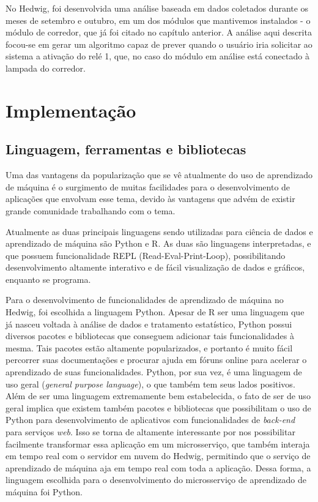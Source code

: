 		No Hedwig, foi desenvolvida uma análise baseada em dados coletados durante os meses de setembro e outubro, em um dos módulos que mantivemos instalados - o módulo de corredor, que já foi citado no capítulo anterior. A análise aqui descrita focou-se em gerar um algoritmo capaz de prever quando o usuário iria solicitar ao sistema a ativação do relé 1, que, no caso do módulo em análise está conectado à lampada do corredor. 



	\section{Implementação}

		\subsection{Linguagem, ferramentas e bibliotecas}

			Uma das vantagens da popularização que se vê atualmente do uso de aprendizado de máquina é o surgimento de muitas facilidades para o desenvolvimento de aplicações que envolvam esse tema, devido às vantagens que advém de existir grande comunidade trabalhando com o tema.

			Atualmente as duas principais linguagens sendo utilizadas para ciência de dados e aprendizado de máquina são Python e R. As duas são linguagens interpretadas, e que possuem funcionalidade REPL (Read-Eval-Print-Loop), possibilitando desenvolvimento altamente interativo e de fácil visualização de dados e gráficos, enquanto se programa.

			Para o desenvolvimento de funcionalidades de aprendizado de máquina no Hedwig, foi escolhida a linguagem Python. Apesar de R ser uma linguagem que já nasceu voltada à análise de dados e tratamento estatístico, Python possui diversos pacotes e bibliotecas que conseguem adicionar tais funcionalidades à mesma. Tais pacotes estão altamente popularizados, e portanto é muito fácil percorrer suas documentações e procurar ajuda em fóruns online para acelerar o aprendizado de suas funcionalidades. Python, por sua vez, é uma linguagem de uso geral (\emph{general purpose language}), o que também tem seus lados positivos. Além de ser uma linguagem extremamente bem estabelecida, o fato de ser de uso geral implica que existem também pacotes e bibliotecas que possibilitam o uso de Python para desenvolvimento de aplicativos com funcionalidades de \emph{back-end} para serviços \emph{web}. Isso se torna de altamente interessante por nos possibilitar facilmente transformar essa aplicação em um microsserviço, que também interaja em tempo real com o servidor em nuvem do Hedwig, permitindo que o serviço de aprendizado de máquina aja em tempo real com toda a aplicação. Dessa forma, a linguagem escolhida para o desenvolvimento do microsserviço de aprendizado de máquina foi Python.

